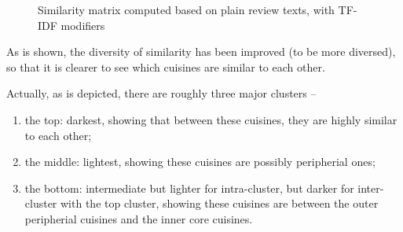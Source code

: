 \documentclass[11pt]{article}
\begin{document}
\begin{figure}[htp!]
  \centering
  \caption{Similarity matrix computed based on plain review texts, with TF-IDF modifiers}
\end{figure}


As is shown, the diversity of similarity has been improved (to be more diversed), so that it is clearer to see which cuisines are similar to each other.

Actually, as is depicted, there are roughly three major clusters --
\begin{enumerate}
    \item the top: darkest, showing that between these cuisines, they are highly similar to each other;
    \item the middle: lightest, showing these cuisines are possibly peripherial ones;
    \item the bottom: intermediate but lighter for intra-cluster, but darker for inter-cluster with the top cluster, showing these cuisines are between the outer peripherial cuisines and the inner core cuisines.
\end{enumerate}
\end{document}
